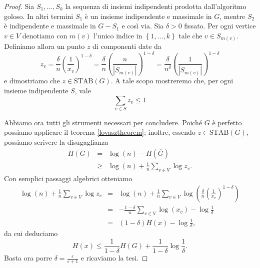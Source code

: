 \begin{proof}
	Sia \(S_1,\dots,S_k\) la sequenza di insiemi indipendenti prodotta dall'algoritmo goloso. In altri termini \(S_1\) è un insieme indipendente e massimale in \(G\), mentre \(S_2\) è indipendente e massimale in \(G-S_1\) e così via. Sia \(\delta>0\) fissato. Per ogni vertice \(v\in V\) denotiamo con \(m(v)\) l'unico indice in \(\left\{1,\dots,k\right\}\) tale che \(v\in S_{m(v)}\). Definiamo allora un punto \(z\) di componenti date da
	\[z_v=\frac{\delta}{n}\left(\frac{1}{x_v}\right)^{1-\delta}=\frac{\delta}{n}\left(\frac{n}{|S_{m(v)}|}\right)^{1-\delta}=\frac{\delta}{n^{\delta}}\left(\frac{1}{|S_{m(v)}|}\right)^{1-\delta}\]
	e dimostriamo che \(z\in\text{STAB}(G)\). A tale scopo mostreremo che, per ogni insieme indipendente \(S\), vale
	\[\sum_{v\in S}{z_v}\le 1\]
	
	Abbiamo ora tutti gli strumenti necessari per concludere. Poiché \(G\) è perfetto possiamo applicare il teorema \ref{lovasztheorem}; inoltre, essendo \(z\in\text{STAB}(G)\), possiamo scrivere la disugaglianza
	\begin{eqnarray}
	  H(G)&=&\log(n)-H(\overline{G}) \nonumber \\
	      &\ge& \log(n) + \frac{1}{n}\sum_{v\in V}{\log{z_v}}.\nonumber
	\end{eqnarray}
	Con semplici passaggi algebrici otteniamo
	\begin{eqnarray}
	     \log(n) + \frac{1}{n}\sum_{v\in V}{\log{z_v}} &=& \log(n) + \frac{1}{n}\sum_{v\in V}{\log\left(\frac{\delta}{n}\left(\frac{1}{x_v}\right)^{1-\delta}\right)} \nonumber \\
	      &=& - \frac{1-\delta}{n}\sum_{v\in V}{\log(x_v)}-\log{\frac{1}{\delta}} \nonumber \\
	      &=& (1-\delta)H(x)-\log{\frac{1}{\delta}} \nonumber,
	\end{eqnarray}
	da cui deduciamo
	\[H(x)\le\frac{1}{1-\delta}H(G)+\frac{1}{1-\delta}\log{\frac{1}{\delta}}.\]
	Basta ora porre \(\delta=\frac{\varepsilon}{\varepsilon+1}\) e ricaviamo la tesi.
\end{proof}
